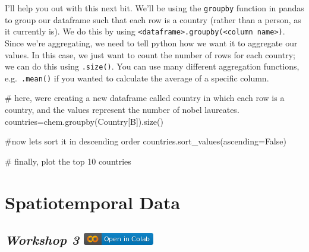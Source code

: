 \documentclass[
  letterpaper,
  DIV=11,
  numbers=noendperiod]{scrreprt}
\newenvironment{Shaded}{\begin{snugshade}}{\end{snugshade}}
\newcommand{\CommentTok}[1]{\textcolor[rgb]{0.37,0.37,0.37}{#1}}
\newcommand{\NormalTok}[1]{\textcolor[rgb]{0.00,0.23,0.31}{#1}}
\newcommand{\OperatorTok}[1]{\textcolor[rgb]{0.37,0.37,0.37}{#1}}
\newcommand{\StringTok}[1]{\textcolor[rgb]{0.13,0.47,0.30}{#1}}
\newcommand{\VariableTok}[1]{\textcolor[rgb]{0.07,0.07,0.07}{#1}}
\begin{document}
I'll help you out with this next bit. We'll be using the
\texttt{groupby} function in pandas to group our dataframe such that
each row is a country (rather than a person, as it currently is). We do
this by using
\texttt{\textless{}dataframe\textgreater{}.groupby(\textquotesingle{}\textless{}column\ name\textgreater{}\textquotesingle{})}.
Since we're aggregating, we need to tell python how we want it to
aggregate our values. In this case, we just want to count the number of
rows for each country; we can do this using \texttt{.size()}. You can
use many different aggregation functions, e.g.~\texttt{.mean()} if you
wanted to calculate the average of a specific column.

\begin{Shaded}
\begin{Highlighting}[]
\CommentTok{\# here, we\textquotesingle{}re creating a new dataframe called \textquotesingle{}country\textquotesingle{} in which each row is a country, and the values represent the number of nobel laureates. }
\NormalTok{countries}\OperatorTok{=}\NormalTok{chem.groupby(}\StringTok{\textquotesingle{}Country[B]\textquotesingle{}}\NormalTok{).size()}

\CommentTok{\#now let\textquotesingle{}s sort it in descending order}
\NormalTok{countries.sort\_values(ascending}\OperatorTok{=}\VariableTok{False}\NormalTok{)}

\CommentTok{\# finally, plot the top 10 countries }
\end{Highlighting}
\end{Shaded}


\hypertarget{spatiotemporal-data}{%
\chapter{Spatiotemporal Data}\label{spatiotemporal-data}}

\hypertarget{workshop-3-open-in-colab}{%
\section[\emph{Workshop 3} ]{\texorpdfstring{\emph{Workshop 3}
\href{https://colab.research.google.com/github/oballinger/QM2/blob/main/notebooks/W03.\%20Spatial\%20Data.ipynb}{\protect\includegraphics{index_files/mediabag/colab-badge.png}}}{Workshop 3 Open In Colab}}\label{workshop-3-open-in-colab}}
\end{document}
